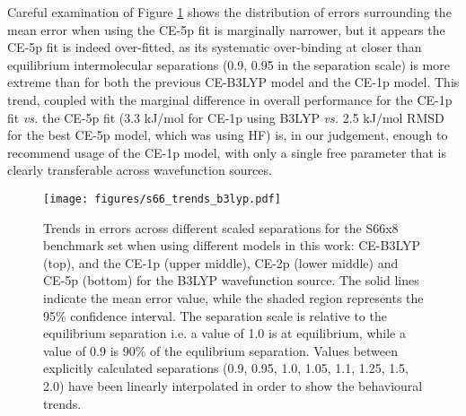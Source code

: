 \documentclass[preprint]{iucr}              %
\begin{document}
Careful examination of Figure \ref{fig:s66_error_vs_sep} shows the distribution of errors surrounding the mean error when using 
the CE-5p fit is marginally narrower, but it appears the CE-5p fit is indeed over-fitted, as its systematic 
over-binding at closer than equilibrium intermolecular separations (0.9, 0.95 in the separation scale) is more extreme than for
both the previous CE-B3LYP model and the CE-1p model. 
This trend, coupled with the marginal difference in overall performance for the CE-1p fit \textit{vs.} the CE-5p fit 
(3.3 kJ/mol for CE-1p using B3LYP \textit{vs.} 2.5 kJ/mol RMSD for the best CE-5p model, which was using HF) is,
in our judgement, enough to recommend usage of the CE-1p model, with only a single free parameter that is clearly 
transferable across wavefunction sources.


\begin{figure}
    \centering
    \texttt{[image: figures/s66\_trends\_b3lyp.pdf]}
    \caption{Trends in errors across different scaled separations for the S66x8 benchmark set when 
    using different models in this work: CE-B3LYP (top),  and the CE-1p (upper middle), 
    CE-2p (lower middle) and CE-5p (bottom) for the B3LYP wavefunction source. 
    The solid lines indicate the mean error value, while the shaded region represents the 95\% confidence interval.
    The separation scale is relative to the equilibrium separation i.e. a value of 1.0 is at equilibrium, while a
    value of 0.9 is 90\% of the equlibrium separation. Values between explicitly
    calculated separations (0.9, 0.95, 1.0, 1.05, 1.1, 1.25, 1.5, 2.0) have been linearly interpolated in order
    to show the behavioural trends.}
    \label{fig:s66_error_vs_sep}
\end{figure}
\end{document}
